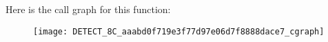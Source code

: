 Here is the call graph for this function:
\nopagebreak
\begin{figure}[H]
\begin{center}
\leavevmode
\texttt{[image: DETECT\_8C\_aaabd0f719e3f77d97e06d7f8888dace7\_cgraph]}
\end{center}
\end{figure}


